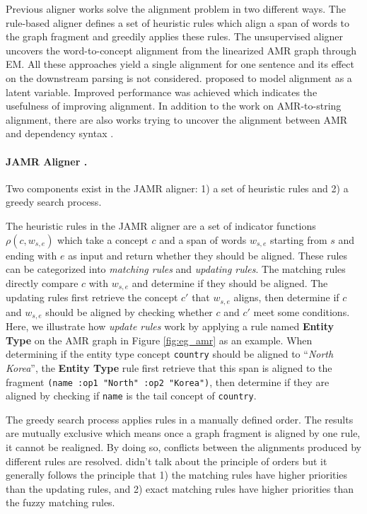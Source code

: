\documentclass[11pt,a4paper]{article}
\begin{document}
Previous aligner works solve the alignment problem
in two different ways.
The rule-based aligner \cite{flanigan-EtAl:2014:P14-1}
defines a set of heuristic rules which align a span of
words to the graph fragment and greedily applies
these rules.
The unsupervised aligner
\cite{pourdamghani-EtAl:2014:EMNLP2014,wang-xue:2017:EMNLP2017}
uncovers the word-to-concept alignment from
the linearized AMR graph through EM.
All these approaches yield a single alignment for one sentence
and its effect on the downstream parsing is not considered.
\citet{P18-1037} proposed to
model alignment as a latent variable.
Improved performance was achieved
which indicates the usefulness of improving alignment.
In addition to the work on AMR-to-string alignment,
there are also works trying to uncover the 
alignment between AMR  and dependency syntax \citep{szubert-lopez-schneider:2018:N18-1}.

\paragraph{JAMR Aligner \cite{flanigan-EtAl:2014:P14-1}.}
Two components exist in the JAMR aligner:
1) a set of heuristic rules and 2) a greedy search process.

The heuristic rules in the JAMR aligner
are a set of indicator functions $\rho(c, w_{s, e})$
which take a concept $c$ and a span of words $w_{s, e}$ starting from $s$ and ending with $e$
as input and return whether
they should be aligned.
These rules  can be categorized into {\it matching rules} and {\it updating rules}.
The matching rules directly compare $c$ with $w_{s, e}$ and determine if they should be aligned.
The updating rules first retrieve the concept $c'$ that $w_{s, e}$ aligns,
then determine if $c$ and $w_{s, e}$ should be aligned by checking whether
$c$ and $c'$ meet some conditions.
Here, we illustrate how \textit{update rules} work by applying a rule named \textbf{Entity Type}
on the AMR graph in Figure \ref{fig:eg_amr}
as an example.
When determining if the entity type concept \texttt{country} should be aligned to ``\textit{North Korea}'',
the \textbf{Entity Type} rule first retrieve that this span is aligned to the fragment \texttt{(name :op1 "North" :op2 "Korea")},
then determine if they are aligned by checking if \texttt{name} is the tail concept of \texttt{country}.


The greedy search process applies rules in a manually defined order.
The results are mutually exclusive which means
once a graph fragment is aligned by one rule, it cannot be realigned.
By doing so, conflicts between the alignments produced by 
different rules are resolved.
\citet{flanigan-EtAl:2014:P14-1} didn't talk about the principle of orders
but it generally follows the principle that 1) the matching rules have higher priorities
than the updating rules, 
and 2) exact matching rules have higher priorities than the fuzzy matching rules.
\end{document}
